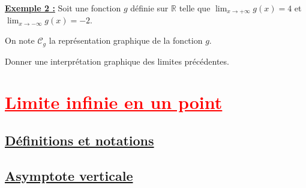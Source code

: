 \documentclass[11pt,a4paper]{article}
\begin{document}
\vspace{3cm}

\textbf{\underline{Exemple 2 :}} Soit une fonction $g$ définie sur $\mathbb{R}$ telle que $\displaystyle{\lim_{x \to +\infty} g(x) = 4}$ et $\displaystyle{\lim_{x \to -\infty} g(x) = -2}$. \par 
On note $\mathscr{C}_g$ la représentation graphique de la fonction $g$. \par 
Donner une interprétation graphique des limites précédentes.

\newpage 

\section{\textcolor{red}{\underline{Limite infinie en un point}}}

\subsection{\textcolor{vert}{\underline{Définitions et notations}}}

\subsection{\textcolor{vert}{\underline{Asymptote verticale}}}
\end{document}

